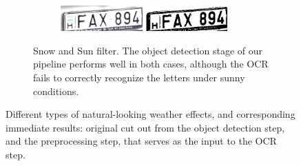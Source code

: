 \begin{figure}
\begin{subfigure}[b]{\textwidth}
\begin{subfigure}[b]{.4\textwidth}
            \includegraphics[width=0.45\textwidth]{figures/weather-results/cutouts/sunny_0.jpg}
            \includegraphics[width=0.45\textwidth]{figures/weather-results/cleared/sunny_0.jpg}
        \end{subfigure}
        \caption{Snow and Sun filter. The object detection stage of our pipeline
            performs well in both cases, although the OCR fails to correctly
            recognize the letters under sunny conditions.}
        \label{fig:weather-snow-sun}
    \end{subfigure}
    \caption{Different types of natural-looking weather effects, and
    corresponding immediate results: original cut out from the object detection
    step, and the preprocessing step, that serves as the input to the OCR step.}
    \label{fig:weather-effects}
\end{figure}

